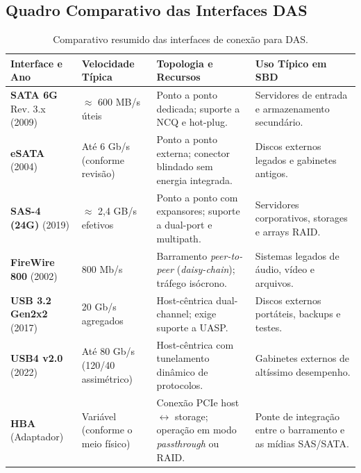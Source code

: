 \documentclass[11pt,a4paper]{article}
\begin{document}
\subsection{Quadro Comparativo das Interfaces DAS}
\begin{table}[H]\centering\caption{Comparativo resumido das interfaces de conexão para DAS.}\label{tab:interfaces}
\small
\setlength{\tabcolsep}{5pt}
\begin{tabularx}{\textwidth}{@{}p{3cm}p{3.5cm}p{4.2cm}Y@{}}\toprule
\textbf{Interface e Ano} & \centering\textbf{Velocidade Típica} & \centering\textbf{Topologia e Recursos}\arraybackslash & \textbf{Uso Típico em SBD}\\\midrule
\textbf{SATA 6G} \newline Rev. 3.x (2009) & $\approx$ 600 MB/s úteis & Ponto a ponto dedicada; suporte a NCQ e \mbox{hot-plug}. & Servidores de entrada e armazenamento secundário. \\
\addlinespace
\textbf{eSATA} \newline (2004) & Até 6 Gb/s (conforme revisão) & Ponto a ponto externa; conector blindado sem energia integrada. & Discos externos legados e gabinetes antigos. \\
\addlinespace
\textbf{SAS-4 (24G)} \newline (2019) & $\approx$ 2,4 GB/s efetivos & Ponto a ponto com expansores; suporte a \mbox{dual-port} e \mbox{multipath}. & Servidores corporativos, storages e arrays RAID. \\
\addlinespace
\textbf{FireWire 800} \newline (2002) & 800 Mb/s & Barramento \emph{peer-to-peer} (\emph{daisy-chain}); tráfego isócrono. & Sistemas legados de áudio, vídeo e arquivos. \\
\addlinespace
\textbf{USB 3.2 Gen2x2} \newline (2017) & 20 Gb/s agregados & Host-cêntrica dual-channel; exige suporte a UASP. & Discos externos portáteis, backups e testes. \\
\addlinespace
\textbf{USB4 v2.0} \newline (2022) & Até 80 Gb/s (120/40 assimétrico) & Host-cêntrica com tunelamento dinâmico de protocolos. & Gabinetes externos de altíssimo desempenho. \\
\addlinespace
\textbf{HBA} \newline (Adaptador) & Variável (conforme o meio físico) & Conexão PCIe host $\leftrightarrow$ storage; operação em modo \emph{passthrough} ou RAID. & Ponte de integração entre o barramento e as mídias SAS/SATA. \\\bottomrule
\end{tabularx}\end{table}
\end{document}
